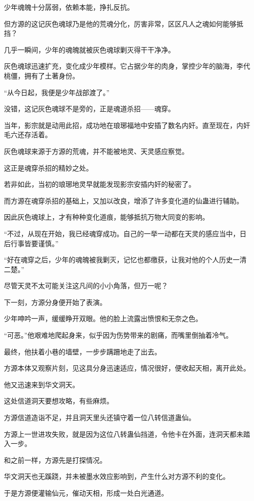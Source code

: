 \begin{this_body}
少年魂魄十分孱弱，依赖本能，挣扎反抗。

但方源的这记灰色魂球乃是他的荒魂分化，厉害非常，区区凡人之魂如何能够抵挡？

几乎一瞬间，少年的魂魄就被灰色魂球剿灭得干干净净。

灰色魂球迅速扩充，变化成少年模样。它占据少年的肉身，掌控少年的脑海，李代桃僵，拥有了土著身份。

“从今日起，我便是少年战部渡了。”

没错，这记灰色魂球不是旁的，正是魂道杀招——魂穿。

当年，影宗就是动用此招，成功地在琅琊福地中安插了数名内奸。直至现在，内奸毛六还存活着。

灰色魂球来源于方源的荒魂，并不能被地灵、天灵感应察觉。

这正是魂穿杀招的精妙之处。

若非如此，当初的琅琊地灵早就能发现影宗安插内奸的秘密了。

而方源在魂穿杀招的基础上，又加以改良，增添了许多变化道的仙蛊进行辅助。

因此灰色魂球上，才有种种变化道痕，能够抵抗万物大同变的影响。

“不过，从现在开始，我已经魂穿成功。自己的一举一动都在天灵的感应当中，日后行事皆要谨慎。”

“好在魂穿之后，少年的魂魄被我剿灭，记忆也都缴获，让我对他的个人历史一清二楚。”

尽管天灵不太可能关注这凡间的小小角落，但万一呢？

下一刻，方源分身便开始了表演。

少年呻吟一声，缓缓睁开双眼。他的脸上流露出愤恨和无奈之色。

“可恶。”他艰难地爬起身来，似乎因为伤势带来的剧痛，而嘴里倒抽着冷气。

最终，他扶着小巷的墙壁，一步步蹒跚地走了出去。

方源本体又观察片刻，见这具分身迅速适应，情况很好，便收起天相，离开此处。

他又迅速来到华文洞天。

这处信道洞天要想攻略，有些麻烦。

方源信道造诣不足，并且洞天里头还镇守着一位八转信道蛊仙。

方源上一世进攻失败，就是因为这位八转蛊仙挡道，令他卡在外面，连洞天都未踏入一步。

和之前一样，方源先是打探情况。

华文洞天也无蹊跷，并未被墨水效应影响到，产生什么对方源不利的变化。

于是方源便灌输仙元，催动天相，形成一处白光通道。


\end{this_body}
